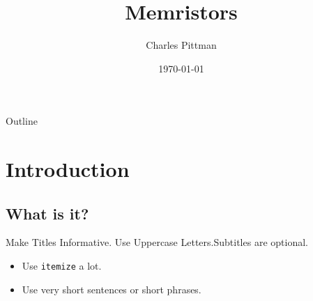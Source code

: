 \documentclass{beamer}
\title{Memristors}
\author{Charles Pittman}
\institute{The Citadel\\ELEC-424}
\date{\today}
\begin{document}
\begin{frame}
  \titlepage
\end{frame}

\begin{frame}{Outline}
  \tableofcontents
\end{frame}




\section{Introduction}

\subsection{What is it?}

\begin{frame}{Make Titles Informative. Use Uppercase Letters.}{Subtitles are optional.}

  \begin{itemize}
  \item
    Use \texttt{itemize} a lot.
  \item
    Use very short sentences or short phrases.
  \end{itemize}
\end{frame}
\end{document}
